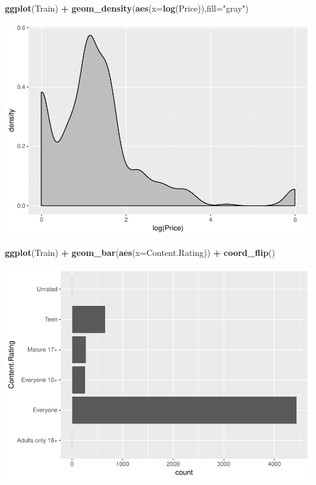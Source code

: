 \documentclass[]{article}
\newenvironment{Shaded}{\begin{snugshade}}{\end{snugshade}}
\newcommand{\DataTypeTok}[1]{\textcolor[rgb]{0.13,0.29,0.53}{#1}}
\newcommand{\KeywordTok}[1]{\textcolor[rgb]{0.13,0.29,0.53}{\textbf{#1}}}
\newcommand{\NormalTok}[1]{#1}
\newcommand{\OperatorTok}[1]{\textcolor[rgb]{0.81,0.36,0.00}{\textbf{#1}}}
\newcommand{\StringTok}[1]{\textcolor[rgb]{0.31,0.60,0.02}{#1}}
\begin{document}
\begin{Shaded}
\begin{Highlighting}[]
\KeywordTok{ggplot}\NormalTok{(Train) }\OperatorTok{+}\StringTok{ }\KeywordTok{geom_density}\NormalTok{(}\KeywordTok{aes}\NormalTok{(}\DataTypeTok{x=}\KeywordTok{log}\NormalTok{(Price)),}\DataTypeTok{fill=}\StringTok{"gray"}\NormalTok{)}
\end{Highlighting}
\end{Shaded}

\includegraphics{Project_2_Work_files/figure-latex/unnamed-chunk-15-5.pdf}

\begin{Shaded}
\begin{Highlighting}[]
\KeywordTok{ggplot}\NormalTok{(Train) }\OperatorTok{+}\StringTok{ }\KeywordTok{geom_bar}\NormalTok{(}\KeywordTok{aes}\NormalTok{(}\DataTypeTok{x=}\NormalTok{Content.Rating)) }\OperatorTok{+}\StringTok{ }\KeywordTok{coord_flip}\NormalTok{()}
\end{Highlighting}
\end{Shaded}

\includegraphics{Project_2_Work_files/figure-latex/unnamed-chunk-15-6.pdf}
\end{document}
